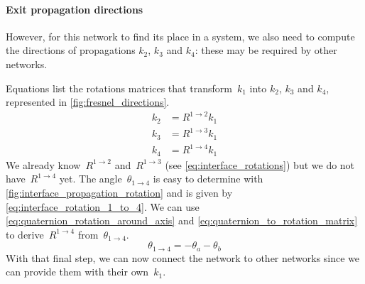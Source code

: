 \paragraph{Exit propagation directions}
However, for this network to find its place in a system, we also need to compute the directions of propagations $k_2$, $k_3$ and $k_4$: these may be required by other networks.

Equations  list the rotations matrices that transform~$k_1$ into $k_2$, $k_3$ and $k_4$, represented in \cref{fig:fresnel_directions}.
\begin{subequations}
    \begin{align}
        k_2 &= R^{1 \rightarrow 2} k_1 \label{eq:interface_propagation_rotation_k2} \\
        k_3 &= R^{1 \rightarrow 3} k_1 \label{eq:interface_propagation_rotation_k3} \\
        k_4 &= R^{1 \rightarrow 4} k_1 \label{eq:interface_propagation_rotation_k4}
    \end{align}
    \label{eq:interface_propagation_rotation_ki}
\end{subequations}
We already know~$R^{1 \rightarrow 2}$ and~$R^{1 \rightarrow 3}$ (see \cref{eq:interface_rotations}) but we do not have~$R^{1 \rightarrow 4}$ yet.
The angle~$\theta_{1 \rightarrow 4}$ is easy to determine with \cref{fig:interface_propagation_rotation} and is given by \cref{eq:interface_rotation_1_to_4}.
We can use \cref{eq:quaternion_rotation_around_axis} and \cref{eq:quaternion_to_rotation_matrix} to derive~$R^{1 \rightarrow 4}$ from~$\theta_{1 \rightarrow 4}$.
\begin{equation}
    \theta_{1 \rightarrow 4} = -\theta_a - \theta_b
    \label{eq:interface_rotation_1_to_4}
\end{equation}
With that final step, we can now connect the network to other networks since we can provide them with their own~$k_1$.


